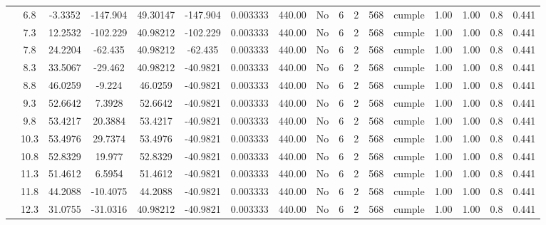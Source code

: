 \begin{table}[H]
{\begin{tabular}{|c|c|c|c|c|c|c|c|c|c|c|c|c|c|c|c|c|}
\cline{2-17}    & \cellcolor[rgb]{ .851,  .882,  .949}6.8 & -3.3352 & -147.904 & 49.30147 & -147.904 & 0.003333 & 440.00 & No  & 6   & 2   & 568 & \cellcolor[rgb]{ .776,  .937,  .808}cumple & 1.00 & 1.00 & 0.8 & 0.441 \bigstrut\\
\cline{2-17}    & 7.3 & 12.2532 & -102.229 & 40.98212 & -102.229 & 0.003333 & 440.00 & No  & 6   & 2   & 568 & \cellcolor[rgb]{ .776,  .937,  .808}cumple & 1.00 & 1.00 & 0.8 & 0.441 \bigstrut\\
\cline{2-17}    & 7.8 & 24.2204 & -62.435 & 40.98212 & -62.435 & 0.003333 & 440.00 & No  & 6   & 2   & 568 & \cellcolor[rgb]{ .776,  .937,  .808}cumple & 1.00 & 1.00 & 0.8 & 0.441 \bigstrut\\
\cline{2-17}    & 8.3 & 33.5067 & -29.462 & 40.98212 & -40.9821 & 0.003333 & 440.00 & No  & 6   & 2   & 568 & \cellcolor[rgb]{ .776,  .937,  .808}cumple & 1.00 & 1.00 & 0.8 & 0.441 \bigstrut\\
\cline{2-17}    & 8.8 & 46.0259 & -9.224 & 46.0259 & -40.9821 & 0.003333 & 440.00 & No  & 6   & 2   & 568 & \cellcolor[rgb]{ .776,  .937,  .808}cumple & 1.00 & 1.00 & 0.8 & 0.441 \bigstrut\\
\cline{2-17}    & 9.3 & 52.6642 & 7.3928 & 52.6642 & -40.9821 & 0.003333 & 440.00 & No  & 6   & 2   & 568 & \cellcolor[rgb]{ .776,  .937,  .808}cumple & 1.00 & 1.00 & 0.8 & 0.441 \bigstrut\\
\cline{2-17}    & 9.8 & 53.4217 & 20.3884 & 53.4217 & -40.9821 & 0.003333 & 440.00 & No  & 6   & 2   & 568 & \cellcolor[rgb]{ .776,  .937,  .808}cumple & 1.00 & 1.00 & 0.8 & 0.441 \bigstrut\\
\cline{2-17}    & 10.3 & 53.4976 & 29.7374 & 53.4976 & -40.9821 & 0.003333 & 440.00 & No  & 6   & 2   & 568 & \cellcolor[rgb]{ .776,  .937,  .808}cumple & 1.00 & 1.00 & 0.8 & 0.441 \bigstrut\\
\cline{2-17}    & 10.8 & 52.8329 & 19.977 & 52.8329 & -40.9821 & 0.003333 & 440.00 & No  & 6   & 2   & 568 & \cellcolor[rgb]{ .776,  .937,  .808}cumple & 1.00 & 1.00 & 0.8 & 0.441 \bigstrut\\
\cline{2-17}    & 11.3 & 51.4612 & 6.5954 & 51.4612 & -40.9821 & 0.003333 & 440.00 & No  & 6   & 2   & 568 & \cellcolor[rgb]{ .776,  .937,  .808}cumple & 1.00 & 1.00 & 0.8 & 0.441 \bigstrut\\
\cline{2-17}    & 11.8 & 44.2088 & -10.4075 & 44.2088 & -40.9821 & 0.003333 & 440.00 & No  & 6   & 2   & 568 & \cellcolor[rgb]{ .776,  .937,  .808}cumple & 1.00 & 1.00 & 0.8 & 0.441 \bigstrut\\
\cline{2-17}    & 12.3 & 31.0755 & -31.0316 & 40.98212 & -40.9821 & 0.003333 & 440.00 & No  & 6   & 2   & 568 & \cellcolor[rgb]{ .776,  .937,  .808}cumple & 1.00 & 1.00 & 0.8 & 0.441 \bigstrut\\

\end{tabular}}
\end{table}
